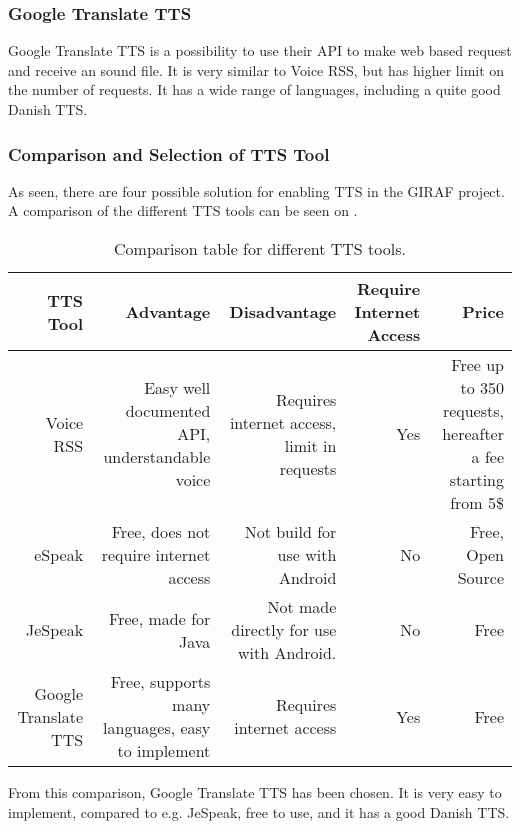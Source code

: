 \subsubsection{Google Translate TTS}
Google Translate TTS is a possibility to use their API to make web based request and receive an sound file. It is very similar to Voice RSS, but has higher limit on the number of requests. It has a wide range of languages, including a quite good Danish TTS. 

\subsubsection{Comparison and Selection of TTS Tool}
As seen, there are four possible solution for enabling TTS in the GIRAF project. A comparison of the different TTS tools can be seen on .

\begin{table}[H]
    \begin{tabularx}{\textwidth}{|R|R|R|R|R|}
    \hline
    \textbf{TTS Tool}             &\textbf{Advantage}                                   &\textbf{Disadvantage}                               & \textbf{Require Internet Access} &\textbf{Price}                                                      \\ \hline
    Voice RSS            & Easy well documented API, understandable voice    & Requires internet access, limit in requests & Yes                     & Free up to 350 requests, hereafter a fee starting from 5\$ \\ \hline
    eSpeak               & Free, does not require internet access            & Not build for use with Android             & No                      & Free, Open Source                                          \\ \hline
    JeSpeak              & Free, made for Java                             & Not made directly for use with Android.    & No                      & Free                                                       \\ \hline
    Google Translate TTS & Free, supports many languages, easy to implement & Requires internet access                    & Yes                     & Free                                                       \\ \hline
    \end{tabularx}
    \caption{Comparison table for different TTS tools.}
    \label{tab:ttscomp}
\end{table}

From this comparison, Google Translate TTS has been chosen. It is very easy to implement, compared to e.g. JeSpeak, free to use, and it has a good Danish TTS.